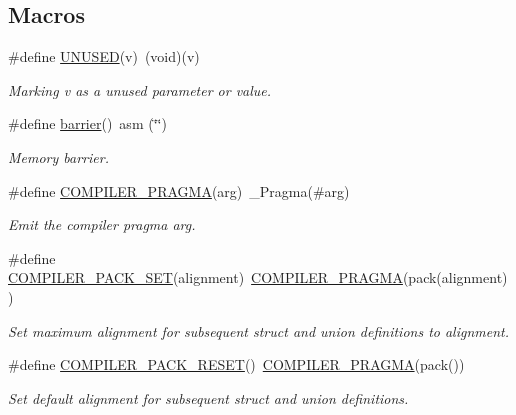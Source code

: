 \subsection*{Macros}
\begin{DoxyCompactItemize}
\item 
\#define \mbox{\hyperlink{group__group__sam0__utils_gada67c62b1c57e07efa04431bc40b9238}{U\+N\+U\+S\+ED}}(v)~(void)(v)
\begin{DoxyCompactList}\small\item\em Marking {\itshape v} as a unused parameter or value. \end{DoxyCompactList}\item 
\#define \mbox{\hyperlink{group__group__sam0__utils_ga53290ac2df2384738b8769c76622f803}{barrier}}()~asm (\char`\"{}\char`\"{})
\begin{DoxyCompactList}\small\item\em Memory barrier. \end{DoxyCompactList}\item 
\#define \mbox{\hyperlink{group__group__sam0__utils_ga85a3ab5701281268521f109ed0078668}{C\+O\+M\+P\+I\+L\+E\+R\+\_\+\+P\+R\+A\+G\+MA}}(arg)~\+\_\+\+Pragma(\#arg)
\begin{DoxyCompactList}\small\item\em Emit the compiler pragma {\itshape arg}. \end{DoxyCompactList}\item 
\#define \mbox{\hyperlink{group__group__sam0__utils_gae2c02ff865ca6538b4b1bddbf2a6876c}{C\+O\+M\+P\+I\+L\+E\+R\+\_\+\+P\+A\+C\+K\+\_\+\+S\+ET}}(alignment)~\mbox{\hyperlink{group__group__sam0__utils_ga85a3ab5701281268521f109ed0078668}{C\+O\+M\+P\+I\+L\+E\+R\+\_\+\+P\+R\+A\+G\+MA}}(pack(alignment))
\begin{DoxyCompactList}\small\item\em Set maximum alignment for subsequent struct and union definitions to {\itshape alignment}. \end{DoxyCompactList}\item 
\#define \mbox{\hyperlink{group__group__sam0__utils_ga38d28b622a4bc7b0f3fb2be2ef1e0086}{C\+O\+M\+P\+I\+L\+E\+R\+\_\+\+P\+A\+C\+K\+\_\+\+R\+E\+S\+ET}}()~\mbox{\hyperlink{group__group__sam0__utils_ga85a3ab5701281268521f109ed0078668}{C\+O\+M\+P\+I\+L\+E\+R\+\_\+\+P\+R\+A\+G\+MA}}(pack())
\begin{DoxyCompactList}\small\item\em Set default alignment for subsequent struct and union definitions. \end{DoxyCompactList}\item 

\end{DoxyCompactItemize}
